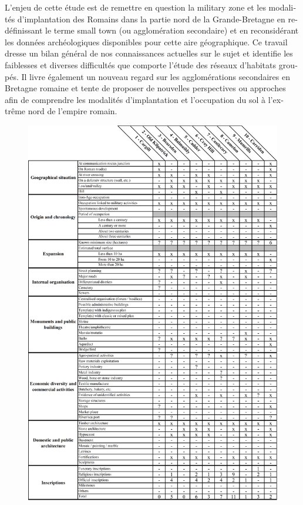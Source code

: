 \begin{myabstract}
\foreignlanguage{french}{%
		L’enjeu de cette étude est de remettre en question la military zone et les modalités d’implantation des Romains dans la partie nord de la Grande-Bretagne en redéfinissant le terme small town (ou agglomération secondaire) et en reconsidérant les données archéologiques disponibles pour cette aire géographique. Ce travail dresse un bilan général de nos connaissances actuelles sur le sujet et identifie les faiblesses et diverses difficultés que comporte l’étude des réseaux d’habitats groupés. Il livre également un nouveau regard sur les agglomérations secondaires en Bretagne romaine et tente de proposer de nouvelles perspectives ou approches afin de comprendre les modalités d’implantation et l’occupation du sol à l’extrême nord de l’empire romain.
	}		
\end{myabstract}
\clearpage
\begin{figure}[!p]
		\includegraphics[width=\linewidth]{figures/rayer_Fig4.jpg}
		\label{fig:Rayer_Fig4}
	\end{figure}
	
